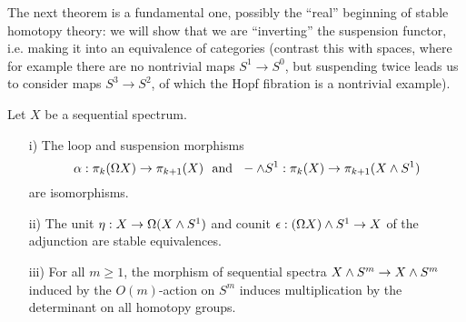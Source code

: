 The next theorem is a fundamental one, possibly the \enquote{real} beginning of stable homotopy theory: we will show that we are \enquote{inverting} the suspension functor, i.e. making it into an equivalence of categories (contrast this with spaces, where for example there are no nontrivial maps $S^1\to S^0$, but suspending twice leads us to consider maps $S^3\to S^2$, of which the Hopf fibration is a nontrivial example).

\begin{theorem}\label{theorem:loop-suspension-isomorphisms-and-co}
Let $X$ be a sequential spectrum.
\begin{itemize}
    \item[i)] The loop and suspension morphisms
    \[\alpha:\pi_k(\Omega X)\to\pi_{k+1}(X)\ \text{ and }\ -\wedge S^1:\pi_k(X)\to\pi_{k+1}(X\wedge S^1)\]
    are isomorphisms.
    \item[ii)] The unit $\eta:X\to\Omega(X\wedge S^1)$ and counit $\epsilon:(\Omega X)\smsh S^1\to X$ of the adjunction are stable equivalences.
    \item[iii)] For all $m\geq1$, the morphism of sequential spectra $X\wedge S^m\to X\wedge S^m$ induced by the $O(m)$-action on $S^m$ induces multiplication by the determinant on all homotopy groups.
\end{itemize}
\end{theorem}

